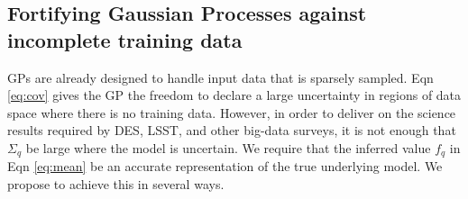 \documentclass[prd,nofootbib,floatfix,11pt,tightenlines,nofootinbib]{revtex4}
\begin{document}
\subsection{Fortifying Gaussian Processes against incomplete training data}
\label{sec:sparse}


GPs are already designed to handle input data that is sparsely
sampled.  Eqn \ref{eq:cov} gives the GP the freedom to declare a large
uncertainty in regions of data space where there is no training data.  However,
in order to deliver on the science results required by DES, LSST, and other
big-data surveys, it is not enough that $\Sigma_q$ be large where the model is
uncertain.  We require that the inferred 
value $f_q$ in Eqn \ref{eq:mean} be an accurate
representation of the true underlying model.  
We propose to achieve this in several ways.
\end{document}
